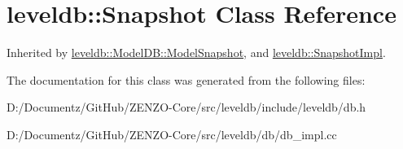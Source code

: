 \hypertarget{classleveldb_1_1_snapshot}{}\section{leveldb\+::Snapshot Class Reference}
\label{classleveldb_1_1_snapshot}


Inherited by \mbox{\hyperlink{classleveldb_1_1_model_d_b_1_1_model_snapshot}{leveldb\+::\+Model\+D\+B\+::\+Model\+Snapshot}}, and \mbox{\hyperlink{classleveldb_1_1_snapshot_impl}{leveldb\+::\+Snapshot\+Impl}}.



The documentation for this class was generated from the following files\+:\begin{DoxyCompactItemize}
\item 
D\+:/\+Documentz/\+Git\+Hub/\+Z\+E\+N\+Z\+O-\/\+Core/src/leveldb/include/leveldb/db.\+h\item 
D\+:/\+Documentz/\+Git\+Hub/\+Z\+E\+N\+Z\+O-\/\+Core/src/leveldb/db/db\+\_\+impl.\+cc\end{DoxyCompactItemize}
